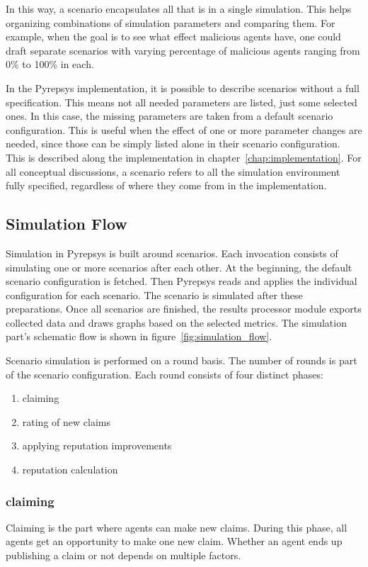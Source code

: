 \documentclass[%
    ]{\PathToTumTemplate/thesis/tum_thesis}
\begin{document}
In this way, a scenario encapsulates all that is in a single simulation.
This helps organizing combinations of simulation parameters and comparing them.
For example, when the goal is to see what effect malicious agents have, one could draft separate scenarios with varying percentage of malicious agents ranging from 0\% to 100\% in each.

In the Pyrepsys implementation, it is possible to describe scenarios without a full specification.
This means not all needed parameters are listed, just some selected ones.
In this case, the missing parameters are taken from a default scenario configuration.
This is useful when the effect of one or more parameter changes are needed, since those can be simply listed alone in their scenario configuration.
This is described along the implementation in chapter~\ref{chap:implementation}.
For all conceptual discussions, a scenario refers to all the simulation environment fully specified, regardless of where they come from in the implementation.


\subsection{Simulation Flow}
Simulation in Pyrepsys is built around \glspl{scenario}.
Each invocation consists of simulating one or more scenarios after each other.
At the beginning, the default scenario configuration is fetched.
Then Pyrepsys reads and applies the individual configuration for each scenario.
The scenario is simulated after these preparations.
Once all scenarios are finished, the results processor module exports collected data and draws graphs based on the selected metrics.
The simulation part's schematic flow is shown in figure~\ref{fig:simulation_flow}.

Scenario simulation is performed on a round basis.
The number of rounds is part of the scenario configuration.
Each round consists of four distinct phases:

\begin{enumerate}
	\item claiming
	\item rating of new claims
	\item applying reputation improvements
	\item reputation calculation
\end{enumerate}

\subsubsection{claiming}
Claiming is the part where agents can make new \glspl{claim}.
During this phase, all agents get an opportunity to make one new claim.
Whether an agent ends up publishing a claim or not depends on multiple factors.
\end{document}
